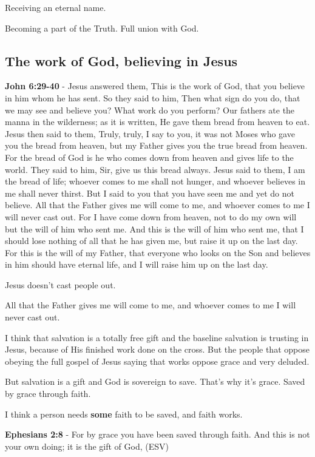 \documentclass[11pt]{article}
\begin{document}
Receiving an eternal name.

Becoming a part of the Truth.
Full union with God.

\subsection{The work of God, believing in Jesus}
\label{sec:org2c295b4}
\textbf{John 6:29-40} - Jesus answered them, This is the work of God, that you believe in him whom he has sent. So they said to him, Then what sign do you do, that we may see and believe you? What work do you perform? Our fathers ate the manna in the wilderness; as it is written, He gave them bread from heaven to eat. Jesus then said to them, Truly, truly, I say to you, it was not Moses who gave you the bread from heaven, but my Father gives you the true bread from heaven. For the bread of God is he who comes down from heaven and gives life to the world. They said to him, Sir, give us this bread always. Jesus said to them, I am the bread of life; whoever comes to me shall not hunger, and whoever believes in me shall never thirst. But I said to you that you have seen me and yet do not believe. All that the Father gives me will come to me, and whoever comes to me I will never cast out. For I have come down from heaven, not to do my own will but the will of him who sent me. And this is the will of him who sent me, that I should lose nothing of all that he has given me, but raise it up on the last day. For this is the will of my Father, that everyone who looks on the Son and believes in him should have eternal life, and I will raise him up on the last day.

Jesus doesn't cast people out.

All that the Father gives me will come to me, and whoever comes to me I will
never cast out.

I think that salvation is a totally free gift and the baseline salvation is trusting in Jesus, because of His
finished work done on the cross. But the people that oppose obeying the full gospel of Jesus saying that works oppose grace and very deluded.

But salvation is a gift and God is sovereign to save.
That's why it's grace.
Saved by grace through faith.

I think a person needs \textbf{some} faith to be saved, and faith works.

\textbf{Ephesians 2:8} - For by grace you have been saved through faith. And this is not your own doing; it is the gift of God, (ESV)
\end{document}
